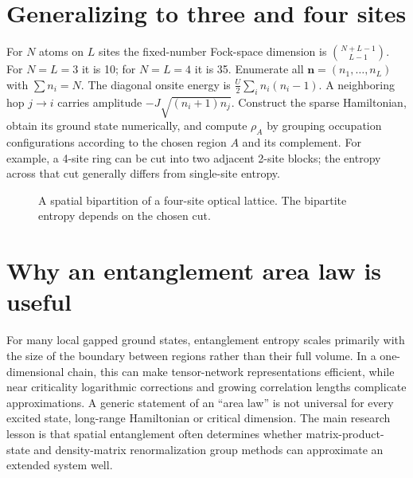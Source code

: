 \documentclass[11pt,a4paper]{article}
\begin{document}
\section{Generalizing to three and four sites}
For $N$ atoms on $L$ sites the fixed-number Fock-space dimension is $\binom{N+L-1}{L-1}$. For $N=L=3$ it is 10; for $N=L=4$ it is 35. Enumerate all $\mathbf n=(n_1,\ldots,n_L)$ with $\sum n_i=N$. The diagonal onsite energy is $\frac U2\sum_i n_i(n_i-1)$. A neighboring hop $j\to i$ carries amplitude $-J\sqrt{(n_i+1)n_j}$. Construct the sparse Hamiltonian, obtain its ground state numerically, and compute $\rho_A$ by grouping occupation configurations according to the chosen region $A$ and its complement. For example, a 4-site ring can be cut into two adjacent 2-site blocks; the entropy across that cut generally differs from single-site entropy.
\begin{figure}[h!]
\centering{}\caption{A spatial bipartition of a four-site optical lattice. The bipartite entropy depends on the chosen cut.}
\end{figure}
\section{Why an entanglement area law is useful}
For many local gapped ground states, entanglement entropy scales primarily with the size of the boundary between regions rather than their full volume. In a one-dimensional chain, this can make tensor-network representations efficient, while near criticality logarithmic corrections and growing correlation lengths complicate approximations. A generic statement of an ``area law'' is not universal for every excited state, long-range Hamiltonian or critical dimension. The main research lesson is that spatial entanglement often determines whether matrix-product-state and density-matrix renormalization group methods can approximate an extended system well.
\end{document}
